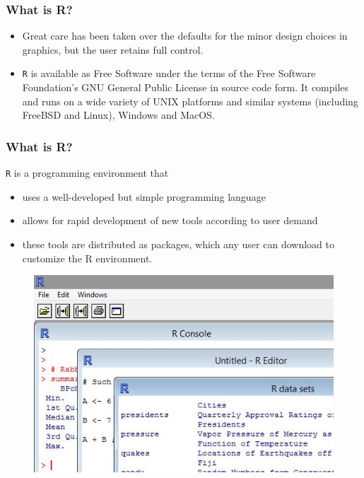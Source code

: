 \documentclass{beamer}
\begin{document}
 		\begin{frame}
 			\frametitle{What is R?}
 			\begin{itemize}
 			\item Great care has been
 			taken over the defaults for the minor design choices in graphics, but the user retains full control.
 			\item \texttt{R} is available as Free Software under the terms of the Free Software Foundation’s GNU General
 			Public License in source code form. It compiles and runs on a wide variety of UNIX platforms
 			and similar systems (including FreeBSD and Linux), Windows and MacOS.
 		\end{itemize}
 	\end{frame}
 	\begin{frame}
 		
 		\frametitle{What is R?}
 		\texttt{R} is a programming environment that
 		\begin{itemize}
 			\item uses a well-developed but simple programming language
 			\item allows for rapid development of new tools according to user demand
 			\item these tools are distributed as packages, which any user can download to customize the R
 			environment.
 		\end{itemize}
 	\end{frame}
 	\begin{frame}
 		\begin{figure}
 			\centering
 			\includegraphics[width=1.2\linewidth]{images/Rmultiplewindows}
 		\end{figure}
 		
 	\end{frame}   
 	
\end{document}
